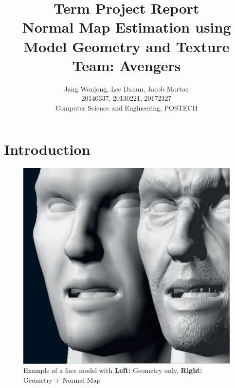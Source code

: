 \documentclass[10pt,twocolumn,letterpaper]{article}
\begin{document}
	
\title{Term Project Report \\
Normal Map Estimation using Model Geometry and Texture \\
Team: Avengers }
\author{Jang Wonjong, Lee Dahun, Jacob Morton\\
	20140337, 20130221, 20172327\\
	Computer Science and Engineering, POSTECH\\
	{\tt\small}}

\maketitle

\section{Introduction}
\begin{figure}[t]
	\begin{center}
		\includegraphics [scale=0.35] {image/face_normalmapping.jpg}
	\end{center}
	\caption{Example of a face model with \textbf{Left:} Geometry only, \textbf{Right:} Geometry + Normal Map}
	\label{fig:title}
\end{figure} 
\end{document}
